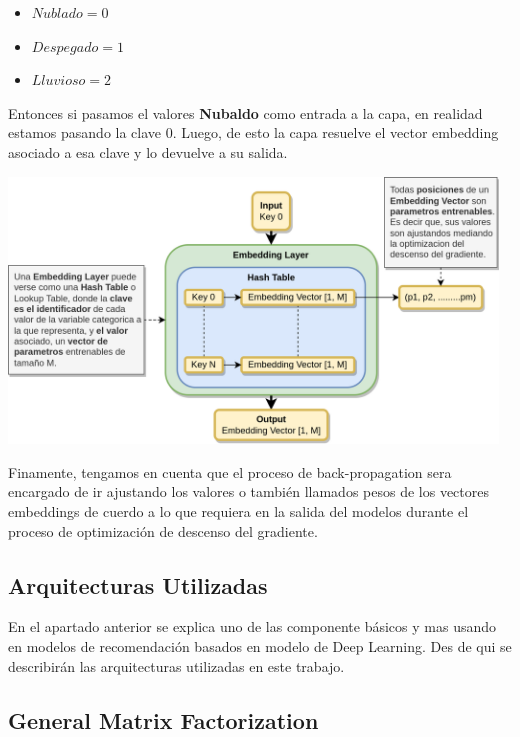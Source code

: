 \documentclass[11pt,a4paper,twoside]{thesis}
\begin{document}
\begin{itemize}
	\item $Nublado    = 0$
	\item $Despegado  = 1$
	\item $Lluvioso   = 2$
\end{itemize}


Entonces si pasamos el valores \textbf{Nubaldo} como entrada a la capa, en realidad estamos pasando la clave 0. Luego, de esto la capa resuelve el vector embedding asociado a esa clave y lo devuelve a su salida.

\begin{center}
	\includegraphics[width=13cm]{./images/Embedding-Layer.png}
\end{center}

Finamente, tengamos en cuenta que el proceso de back-propagation sera encargado de ir ajustando los valores o también llamados pesos de los vectores embeddings de cuerdo a lo que requiera en la salida del modelos durante el proceso de optimización de descenso del gradiente. 


\subsection{Arquitecturas Utilizadas}

En el apartado anterior se explica uno de las componente básicos y mas usando en modelos de recomendación basados en modelo de Deep Learning. Des de qui se describirán las arquitecturas utilizadas en este trabajo.

\subsection{General Matrix Factorization}
\end{document}
